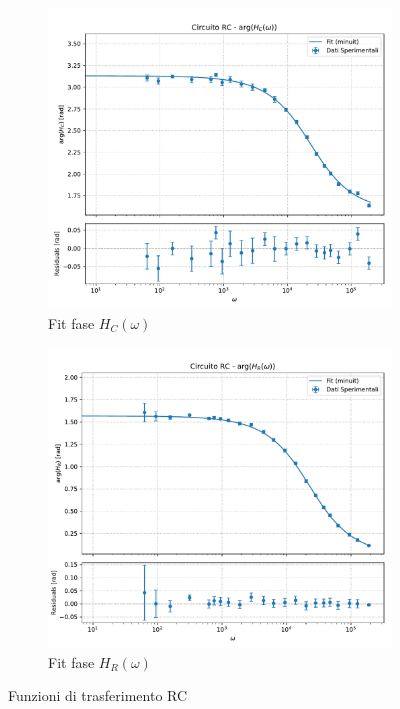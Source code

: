 \documentclass[a4paper]{article}
\begin{document}
\begin{figure}[htbp]
    \vspace{\baselineskip}

    \begin{subfigure}[b]{0.495\textwidth}
        \centering
        \includegraphics[width=\linewidth]{grafici/rc_fase_hc.pdf}
        \caption{Fit fase $H_C(\omega)$}
        \label{fig:rc_fase_hc}
    \end{subfigure}
    \hfill
    \begin{subfigure}[b]{0.495\textwidth}
        \centering
        \includegraphics[width=\linewidth]{grafici/rc_fase_hr.pdf}
        \caption{Fit fase $H_R(\omega)$}
        \label{fig:rc_fase_hr}
    \end{subfigure}

    \caption{Funzioni di trasferimento RC}
    \label{fig:funzioni_di_trasferimento_rc}
\end{figure}
\end{document}
